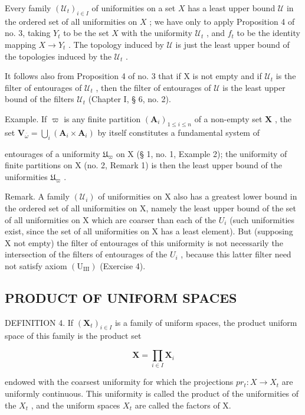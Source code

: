 Every family \((\mathcal{U}_t)_{i\in I}\) of uniformities on a set \(X\) has a least upper bound \(\mathcal{U}\) in the ordered set of all uniformities on \(X\) ; we have only to apply Proposition 4 of no. 3, taking \(Y_t\) to be the set \(X\) with the uniformity \(\mathcal{U}_t\) , and \(f_t\) to be the identity mapping \(X\to Y_t\) . The topology induced by \(\mathcal{U}\) is just the least upper bound of the topologies induced by the \(\mathcal{U}_t\) .

It follows also from Proposition 4 of no. 3 that if X is not empty and if \(\mathcal{U}_{t}\) is the filter of entourages of \(\mathcal{U}_{t}\) , then the filter of entourages of \(\mathcal{U}\) is the least upper bound of the filters \(\mathcal{U}_{t}\) (Chapter I, § 6, no. 2).

Example. If \(\varpi\) is any finite partition \((\mathbf{A}_i)_{1 \leqslant i \leqslant n}\) of a non-empty set \(\mathbf{X}\) , the set \(\mathbf{V}_{\overline{\omega}} = \bigcup_{i} (\mathbf{A}_i \times \mathbf{A}_i)\) by itself constitutes a fundamental system of

entourages of a uniformity \(\mathfrak{U}_{\varpi}\) on X (§ 1, no. 1, Example 2); the uniformity of finite partitions on X (no. 2, Remark 1) is then the least upper bound of the uniformities \(\mathfrak{U}_{\varpi}\) .

Remark. A family \((\mathcal{U}_{i})\) of uniformities on X also has a greatest lower bound in the ordered set of all uniformities on X, namely the least upper bound of the set of all uniformities on X which are coarser than each of the \(U_{i}\) (such uniformities exist, since the set of all uniformities on X has a least element). But (supposing X not empty) the filter of entourages of this uniformity is not necessarily the intersection of the filters of entourages of the \(U_{i}\) , because this latter filter need not satisfy axiom \((\mathrm{U}_{\mathrm{III}})\) (Exercise 4).

\subsection{PRODUCT OF UNIFORM SPACES}

DEFINITION 4. If \((\mathbf{X}_t)_{i\in I}\) is a family of uniform spaces, the product uniform space of this family is the product set

\[
\mathbf {X} = \prod_ {i \in I} \mathbf {X} _ {i}
\]

endowed with the coarsest uniformity for which the projections \(pr_{t}: X \rightarrow X_{t}\) are uniformly continuous. This uniformity is called the product of the uniformities of the \(X_{t}\) , and the uniform spaces \(X_{t}\) are called the factors of X.

